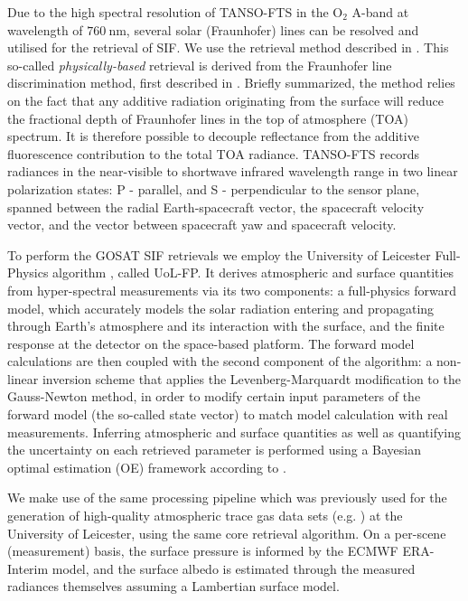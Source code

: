 \documentclass[preprint, a4paper, 10pt, times, 5p]{elsarticle}
\begin{document}
Due to the high spectral resolution of TANSO-FTS in the O$_2$ A-band at wavelength of $760\:\mathrm{nm}$, several solar (Fraunhofer) lines can be resolved and utilised for the retrieval of SIF. We use the retrieval method described in \citet{Frankenberg2011}. This so-called \textit{physically-based} retrieval is derived from the Fraunhofer line discrimination method, first described in \citet{plascyk_fraunhofer_1975}. Briefly summarized, the method relies on the fact that any additive radiation originating from the surface will reduce the fractional depth of Fraunhofer lines in the top of atmosphere (TOA) spectrum. It is therefore possible to decouple reflectance from the additive fluorescence contribution to the total TOA radiance. TANSO-FTS records radiances in the near-visible to shortwave infrared wavelength range in two linear polarization states: P - parallel, and S - perpendicular to the sensor plane, spanned between the radial Earth-spacecraft vector, the spacecraft velocity vector, and the vector between spacecraft yaw and spacecraft velocity.

To perform the GOSAT SIF retrievals we employ the University of Leicester Full-Physics algorithm \citep{Cogan2012}, called UoL-FP. It derives atmospheric and surface quantities from hyper-spectral measurements via its two components: a full-physics forward model, which accurately models the solar radiation entering and propagating through Earth's atmosphere and its interaction with the surface, and the finite response at the detector on the space-based platform. The forward model calculations are then coupled with the second component of the algorithm: a non-linear inversion scheme that applies the Levenberg-Marquardt modification to the Gauss-Newton method, in order to modify certain input parameters of the forward model (the so-called state vector) to match model calculation with real measurements. Inferring atmospheric and surface quantities as well as quantifying the uncertainty on each retrieved parameter is performed using a Bayesian optimal estimation (OE) framework according to \citet{Rodgers2000}.

We make use of the same processing pipeline which was previously used for the generation of high-quality atmospheric trace gas data sets (e.g. \citet{Buchwitz2017,Trent2018}) at the University of Leicester, using the same core retrieval algorithm. On a per-scene (measurement) basis, the surface pressure is informed by the ECMWF ERA-Interim model, and the surface albedo is estimated through the measured radiances themselves assuming a Lambertian surface model.
\end{document}

